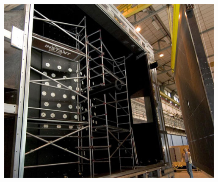 \begin{frame}
    \begin{figure}[h]
        \centering
        \includegraphics[height=\textheight]{Figures Introductory Lecture/LHCb Detector/LHCb_RICH2.jpg}%
        \end{figure}
\end{frame}
